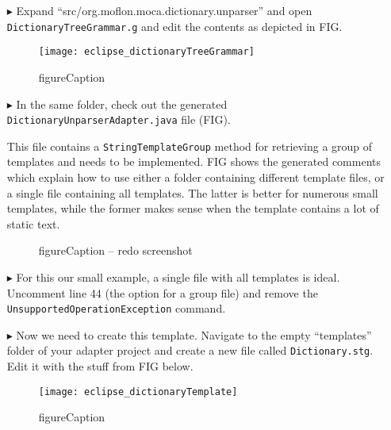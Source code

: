 \begin{itemize}

\item[$\blacktriangleright$] Expand ``src/org.moflon.moca.dictionary.unparser'' and open \texttt{Dict\-ion\-ary\-Tree\-Gram\-mar.g} and edit the contents as
depicted in FIG. 

\begin{figure}[htpb]
\begin{center}
  \texttt{[image: eclipse\_dictionaryTreeGrammar]}
  \caption{figureCaption}
  \label{eclipse:treeGrammar}
\end{center}
\end{figure}

\item[$\blacktriangleright$] In the same folder, check out the generated \texttt{Dict\-ion\-ary\-Un\-pars\-er\-Ad\-ap\-ter.java} file (FIG). 

This file contains a \texttt{StringTemplateGroup} method for retrieving a group of templates and needs to be implemented. FIG shows the generated comments which
explain how to use either a folder containing different template files, or a single file containing all templates. The latter is better for numerous small
templates, while the former makes sense when the template contains a lot of static text.

\begin{figure}[htpb]
\begin{center}
  \caption{figureCaption -- redo screenshot}
  \label{eclipse:unparserCommented}
\end{center}
\end{figure}


\item[$\blacktriangleright$] For this our small example, a single file with all templates is ideal. Uncomment line 44 (the option for a group file) and remove
the \texttt{Un\-sup\-port\-ed\-Op\-er\-at\-ion\-Ex\-cep\-tion} command.

\item[$\blacktriangleright$] Now we need to create this template. Navigate to the empty ``templates'' folder of your adapter project and create a new file
called \texttt{Dictionary.stg}. Edit it with the stuff from FIG below.

\begin{figure}[htpb]
\begin{center}
  \texttt{[image: eclipse\_dictionaryTemplate]}
  \caption{figureCaption}
  \label{eclipse:dictionaryTemplate}
\end{center}
\end{figure}


\end{itemize}

